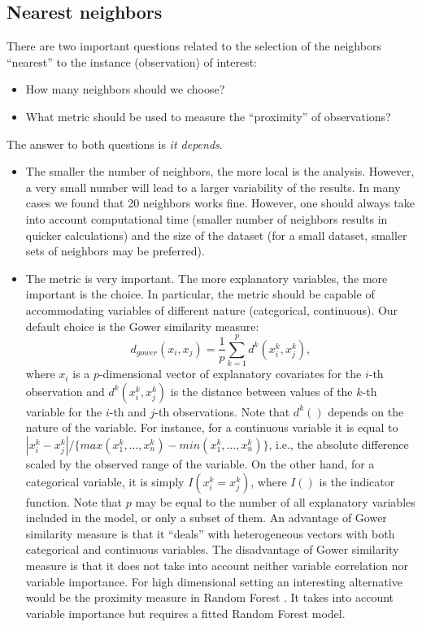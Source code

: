 \documentclass[]{krantz}
\providecommand{\tightlist}{%
  \setlength{\itemsep}{0pt}\setlength{\parskip}{0pt}}
\begin{document}
\hypertarget{cPLocDiagNeighbors}{%
\subsection{Nearest neighbors}\label{cPLocDiagNeighbors}}

There are two important questions related to the selection of the neighbors ``nearest'' to the instance (observation) of interest:

\begin{itemize}
\tightlist
\item
  How many neighbors should we choose?
\item
  What metric should be used to measure the ``proximity'' of observations?
\end{itemize}

The answer to both questions is \emph{it depends}.

\begin{itemize}
\tightlist
\item
  The smaller the number of neighbors, the more local is the analysis. However, a very small number will lead to a larger variability of the results. In many cases we found that 20 neighbors works fine. However, one should always take into account computational time (smaller number of neighbors results in quicker calculations) and the size of the dataset (for a small dataset, smaller sets of neighbors may be preferred).
\item
  The metric is very important. The more explanatory variables, the more important is the choice. In particular, the metric should be capable of accommodating variables of different nature (categorical, continuous). Our default choice is the Gower similarity measure:
  \[
  d_{gower}(x_i, x_j) = \frac 1p \sum_{k=1}^p d^k(x_i^k, x_j^k),
  \]
  where \(x_i\) is a \(p\)-dimensional vector of explanatory covariates for the \(i\)-th observation and \(d^k(x_i^k,x_j^k)\) is the distance between values of the \(k\)-th variable for the \(i\)-th and \(j\)-th observations. Note that \(d^k()\) depends on the nature of the variable. For instance, for a continuous variable it is equal to \(|x_i^k-x_j^k|/\{max(x_1^k,\ldots,x_n^k)-min(x_1^k,\ldots,x_n^k)\}\), i.e., the absolute difference scaled by the observed range of the variable. On the other hand, for a categorical variable, it is simply \(I(x_i^k = x_j^k)\), where \(I()\) is the indicator function. Note that \(p\) may be equal to the number of all explanatory variables included in the model, or only a subset of them. An advantage of Gower similarity measure is that it ``deals'' with heterogeneous vectors with both categorical and continuous variables.
  The disadvantage of Gower similarity measure is that it does not take into account neither variable correlation nor variable importance. For high dimensional setting an interesting alternative would be the proximity measure in Random Forest \citep{randomForestBreiman}. It takes into account variable importance but requires a fitted Random Forest model.
\end{itemize}
\end{document}
